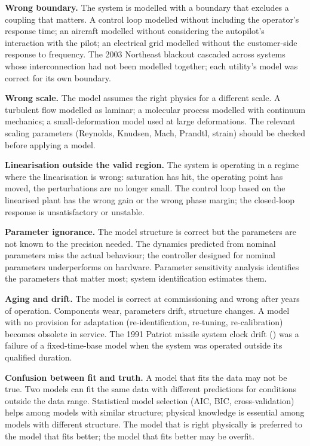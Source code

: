 \textbf{Wrong boundary.} The system is modelled with a boundary that excludes a coupling that matters. A control loop modelled without including the operator's response time; an aircraft modelled without considering the autopilot's interaction with the pilot; an electrical grid modelled without the customer-side response to frequency. The 2003 Northeast blackout cascaded across systems whose interconnection had not been modelled together; each utility's model was correct for its own boundary.

\textbf{Wrong scale.} The model assumes the right physics for a different scale. A turbulent flow modelled as laminar; a molecular process modelled with continuum mechanics; a small-deformation model used at large deformations. The relevant scaling parameters (Reynolds, Knudsen, Mach, Prandtl, strain) should be checked before applying a model.

\textbf{Linearisation outside the valid region.} The system is operating in a regime where the linearisation is wrong: saturation has hit, the operating point has moved, the perturbations are no longer small. The control loop based on the linearised plant has the wrong gain or the wrong phase margin; the closed-loop response is unsatisfactory or unstable.

\textbf{Parameter ignorance.} The model structure is correct but the parameters are not known to the precision needed. The dynamics predicted from nominal parameters miss the actual behaviour; the controller designed for nominal parameters underperforms on hardware. Parameter sensitivity analysis identifies the parameters that matter most; system identification estimates them.

\textbf{Aging and drift.} The model is correct at commissioning and wrong after years of operation. Components wear, parameters drift, structure changes. A model with no provision for adaptation (re-identification, re-tuning, re-calibration) becomes obsolete in service. The 1991 Patriot missile system clock drift (\cite{acc:gao-patriot-1992}) was a failure of a fixed-time-base model when the system was operated outside its qualified duration.

\textbf{Confusion between fit and truth.} A model that fits the data may not be true. Two models can fit the same data with different predictions for conditions outside the data range. Statistical model selection (AIC, BIC, cross-validation) helps among models with similar structure; physical knowledge is essential among models with different structure. The model that is right physically is preferred to the model that fits better; the model that fits better may be overfit.

